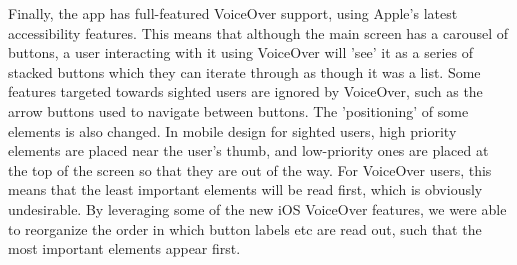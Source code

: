 \documentclass[a4paper,11pt]{article}
\begin{document}
Finally, the app has full-featured VoiceOver support, using Apple's latest accessibility features. This means that although the main screen has a carousel of buttons, a user interacting with it using VoiceOver will 'see' it as a series of stacked buttons which they can iterate through as though it was a list. Some features targeted towards sighted users are ignored by VoiceOver, such as the arrow buttons used to navigate between buttons. The 'positioning' of some elements is also changed. In mobile design for sighted users, high priority elements are placed near the user's thumb, and low-priority ones are placed at the top of the screen so that they are out of the way. For VoiceOver users, this means that the least important elements will be read first, which is obviously undesirable. By leveraging some of the new iOS VoiceOver features, we were able to reorganize the order in which button labels etc are read out, such that the most important elements appear first.
\end{document}
